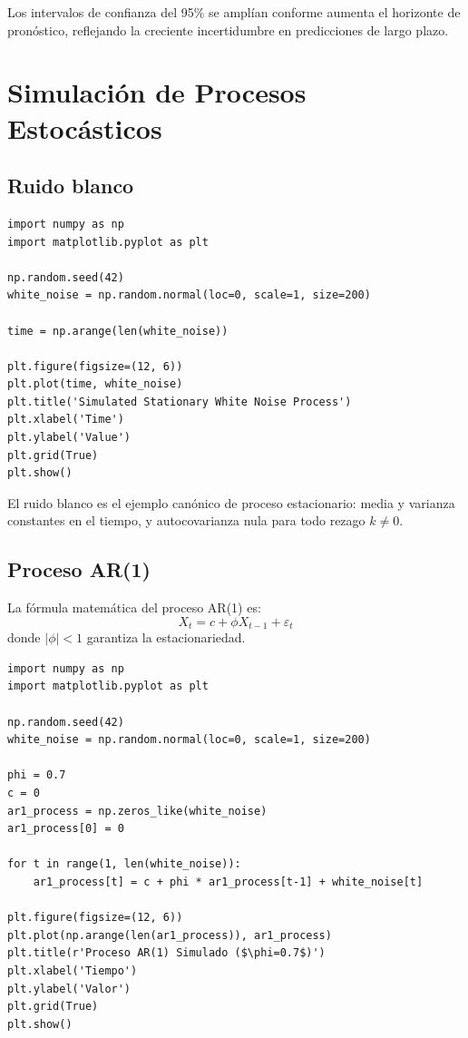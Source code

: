\documentclass[12pt, a4paper]{article}
\begin{document}
Los intervalos de confianza del 95\% se amplían conforme aumenta el horizonte de
pronóstico, reflejando la creciente incertidumbre en predicciones de largo plazo.

\section{Simulación de Procesos Estocásticos}

\subsection{Ruido blanco}

\begin{lstlisting}
import numpy as np
import matplotlib.pyplot as plt

np.random.seed(42)
white_noise = np.random.normal(loc=0, scale=1, size=200)

time = np.arange(len(white_noise))

plt.figure(figsize=(12, 6))
plt.plot(time, white_noise)
plt.title('Simulated Stationary White Noise Process')
plt.xlabel('Time')
plt.ylabel('Value')
plt.grid(True)
plt.show()
\end{lstlisting}

El ruido blanco es el ejemplo canónico de proceso estacionario: media y varianza
constantes en el tiempo, y autocovarianza nula para todo rezago $k \neq 0$.

\subsection{Proceso AR(1)}

La fórmula matemática del proceso AR(1) es:
\[
  X_t = c + \phi X_{t-1} + \varepsilon_t
\]
donde $|\phi| < 1$ garantiza la estacionariedad.

\begin{lstlisting}
import numpy as np
import matplotlib.pyplot as plt

np.random.seed(42)
white_noise = np.random.normal(loc=0, scale=1, size=200)

phi = 0.7
c = 0
ar1_process = np.zeros_like(white_noise)
ar1_process[0] = 0

for t in range(1, len(white_noise)):
    ar1_process[t] = c + phi * ar1_process[t-1] + white_noise[t]

plt.figure(figsize=(12, 6))
plt.plot(np.arange(len(ar1_process)), ar1_process)
plt.title(r'Proceso AR(1) Simulado ($\phi=0.7$)')
plt.xlabel('Tiempo')
plt.ylabel('Valor')
plt.grid(True)
plt.show()
\end{lstlisting}
\end{document}
